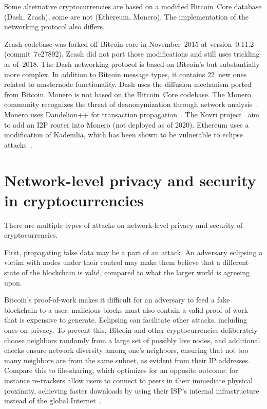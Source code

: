 Some alternative cryptocurrencies are based on a modified Bitcoin~Core database (Dash, Zcash), some are not (Ethereum, Monero).
The implementation of the networking protocol also differs.

Zcash codebase was forked off Bitcoin core in November~2015 at version~0.11.2 (commit~7e27892).
Zcash did not port those modifications and still uses trickling as of~2018.
The Dash networking protocol is based on Bitcoin's but substantially more complex.
In addition to Bitcoin message types, it contains 22~new ones related to masternode functionality.
Dash uses the diffusion mechanism ported from Bitcoin.
Monero is not based on the Bitcoin~Core codebase.
The Monero community recognizes the threat of deanonymization through network analysis~\cite{user36432017, manontheinside2016, expez2016, Cameron2016}.
Monero uses Dandelion++ for transaction propagation~\cite{ErCiccione2020}.
The Kovri project~\cite{Kovri} aim to add an I2P router into Monero (not deployed as of 2020).
Ethereum uses a modification of Kademlia, which has been shown to be vulnerable to eclipse attacks~\cite{Henningsen2019,Marcus2018}.


\section{Network-level privacy and security in cryptocurrencies}

There are multiple types of attacks on network-level privacy and security of cryptocurrencies.

First, propagating false data may be a part of an attack.
An adversary eclipsing a victim with nodes under their control may make them believe that a different state of the blockchain is valid, compared to what the larger world is agreeing upon.

Bitcoin's proof-of-work makes it difficult for an adversary to feed a fake blockchain to a user: malicious blocks must also contain a valid proof-of-work that is expensive to generate.
Eclipsing can facilitate other attacks, including ones on privacy.
To prevent this, Bitcoin and other cryptocurrencies deliberately choose neighbors randomly from a large set of possibly live nodes, and additional checks ensure network diversity among one's neighbors, ensuring that not too many neighbors are from the same subnet, as evident from their IP addresses.
Compare this to file-sharing, which optimizes for an opposite outcome: for instance re-trackers allow users to connect to peers in their immediate physical proximity, achieving faster downloads by using their ISP's internal infrastructure instead of the global Internet~\cite{Yoshida2012,Wang2012}.

